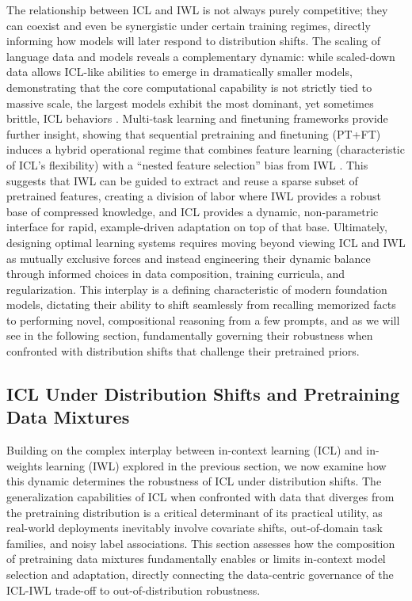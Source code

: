 \documentclass[11pt]{article}
\begin{document}
The relationship between ICL and IWL is not always purely competitive; they can coexist and even be synergistic under certain training regimes, directly informing how models will later respond to distribution shifts. The scaling of language data and models reveals a complementary dynamic: while scaled-down data allows ICL-like abilities to emerge in dramatically smaller models, demonstrating that the core computational capability is not strictly tied to massive scale, the largest models exhibit the most dominant, yet sometimes brittle, ICL behaviors \cite{ref16}. Multi-task learning and finetuning frameworks provide further insight, showing that sequential pretraining and finetuning (PT+FT) induces a hybrid operational regime that combines feature learning (characteristic of ICL's flexibility) with a ``nested feature selection'' bias from IWL \cite{ref111}. This suggests that IWL can be guided to extract and reuse a sparse subset of pretrained features, creating a division of labor where IWL provides a robust base of compressed knowledge, and ICL provides a dynamic, non-parametric interface for rapid, example-driven adaptation on top of that base. Ultimately, designing optimal learning systems requires moving beyond viewing ICL and IWL as mutually exclusive forces and instead engineering their dynamic balance through informed choices in data composition, training curricula, and regularization. This interplay is a defining characteristic of modern foundation models, dictating their ability to shift seamlessly from recalling memorized facts to performing novel, compositional reasoning from a few prompts, and as we will see in the following section, fundamentally governing their robustness when confronted with distribution shifts that challenge their pretrained priors.

\subsection{ICL Under Distribution Shifts and Pretraining Data Mixtures}

Building on the complex interplay between in-context learning (ICL) and in-weights learning (IWL) explored in the previous section, we now examine how this dynamic determines the robustness of ICL under distribution shifts. The generalization capabilities of ICL when confronted with data that diverges from the pretraining distribution is a critical determinant of its practical utility, as real-world deployments inevitably involve covariate shifts, out-of-domain task families, and noisy label associations. This section assesses how the composition of pretraining data mixtures fundamentally enables or limits in-context model selection and adaptation, directly connecting the data-centric governance of the ICL-IWL trade-off to out-of-distribution robustness.
\end{document}

